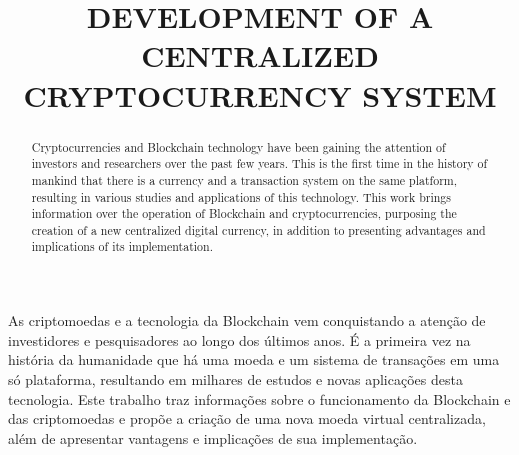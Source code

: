 \documentclass[openright]{normas-utf-tex} %
\title{\MakeUppercase{Development of a Centralized Cryptocurrency System}} %
\begin{document}
\capa %
\folhaderosto %





\begin{resumo}
As criptomoedas e a tecnologia da Blockchain vem conquistando a atenção de investidores e pesquisadores ao longo dos últimos anos. É a primeira vez na história da humanidade que há uma moeda e um sistema de transações em uma só plataforma, resultando em milhares de estudos e novas aplicações desta tecnologia. Este trabalho traz informações sobre o funcionamento da Blockchain e das criptomoedas e propõe a criação de uma nova moeda virtual centralizada, além de apresentar vantagens e implicações de sua implementação.
\end{resumo}

\begin{abstract}
Cryptocurrencies and Blockchain technology have been gaining the attention of investors and researchers over the past few years. This is the first time in the history of mankind that there is a currency and a transaction system on the same platform, resulting in various studies and applications of this technology. This work brings information over the operation of Blockchain and cryptocurrencies, purposing the creation of a new centralized digital currency, in addition to presenting advantages and implications of its implementation.
\end{abstract}

\end{document}

